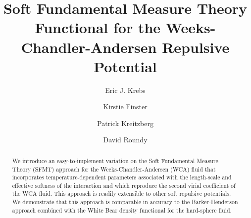\documentclass[letterpaper,twocolumn,amsmath,amssymb,prb]{revtex4-1}
\newcommand\kirstiesays[1]{{\bf \color{red}K: #1}}
\begin{document}
\title{Soft Fundamental Measure Theory Functional for the
  Weeks-Chandler-Andersen Repulsive Potential}

\author{Eric J. Krebs}

\author{Kirstie Finster}

\author{Patrick Kreitzberg}

\author{David Roundy}

\begin{abstract}
  We introduce an easy-to-implement variation on the Soft Fundamental
  Measure Theory (SFMT) approach for the Weeks-Chandler-Andersen (WCA)
  fluid that incorporates temperature-dependent parameters associated
  with the length-scale and effective softness of the interaction and 
  which reproduce the second virial coefficient of the WCA fluid.
  This approach is readily extensible to other soft repulsive
  potentials.  We demonstrate that this approach is comparable in
  accuracy to the Barker-Henderson approach combined with the White
  Bear density functional for the hard-sphere fluid.
\end{abstract}

\maketitle



\end{document}
